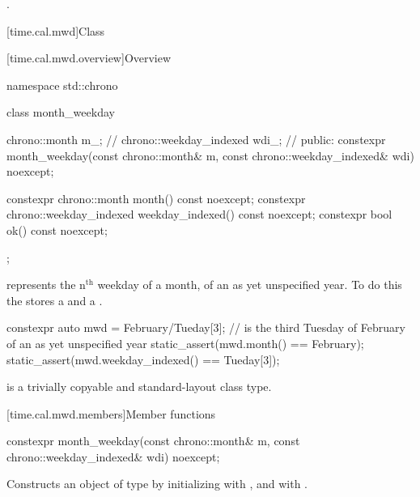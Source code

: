 \begin{itemdescr}
\pnum
\returns {}.
\end{itemdescr}

[time.cal.mwd]{Class }

[time.cal.mwd.overview]{Overview}

\begin{codeblock}
namespace std::chrono {
  class month_weekday {
    chrono::month           m_;         // \expos
    chrono::weekday_indexed wdi_;       // \expos
  public:
    constexpr month_weekday(const chrono::month& m, const chrono::weekday_indexed& wdi) noexcept;

    constexpr chrono::month           month()           const noexcept;
    constexpr chrono::weekday_indexed weekday_indexed() const noexcept;
    constexpr bool ok() const noexcept;
  };
}
\end{codeblock}

\pnum
{} represents the n$^\textrm{th}$ weekday of a month,
of an as yet unspecified year.
To do this the  stores a  and a .

\pnum
\begin{example}
\begin{codeblock}
constexpr auto mwd
    = February/Tueday[3];               //  is the third Tuesday of February of an as yet unspecified year
static_assert(mwd.month() == February);
static_assert(mwd.weekday_indexed() == Tueday[3]);
\end{codeblock}
\end{example}

\pnum
{} is a trivially copyable and standard-layout class type.

[time.cal.mwd.members]{Member functions}

%
\begin{itemdecl}
constexpr month_weekday(const chrono::month& m, const chrono::weekday_indexed& wdi) noexcept;
\end{itemdecl}

\begin{itemdescr}
\pnum
\effects
Constructs an object of type  by
initializing  with , and  with .
\end{itemdescr}


